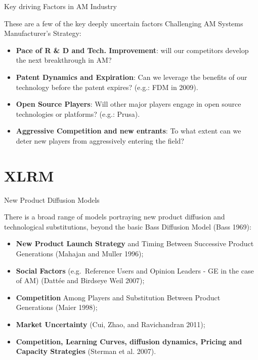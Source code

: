 \documentclass[12pt,ignorenonframetext,]{beamer}
\providecommand{\tightlist}{%
  \setlength{\itemsep}{0pt}\setlength{\parskip}{0pt}}
\begin{document}
\begin{frame}{Key driving Factors in AM Industry}
\protect\hypertarget{key-driving-factors-in-am-industry}{}

These are a few of the key deeply uncertain factors Challenging AM
Systems Manufacturer's Strategy:

\begin{itemize}
\item
  \textbf{Pace of R \& D and Tech. Improvement}: will our competitors
  develop the next breakthrough in AM?
\item
  \textbf{Patent Dynamics and Expiration}: Can we leverage the benefits
  of our technology before the patent expires? (e.g.: FDM in 2009).
\item
  \textbf{Open Source Players}: Will other major players engage in open
  source technologies or platforms? (e.g.: Prusa).
\item
  \textbf{Aggressive Competition and new entrants}: To what extent can
  we deter new players from aggressively entering the field?
\end{itemize}

\end{frame}

\hypertarget{xlrm}{%
\section{XLRM}\label{xlrm}}

\begin{frame}{New Product Diffusion Models}
\protect\hypertarget{new-product-diffusion-models}{}

There is a broad range of models portraying new product diffusion and
technological substitutions, beyond the basic Bass Diffusion Model (Bass
1969):

\begin{itemize}
\tightlist
\item
  \textbf{New Product Launch Strategy} and Timing Between Successive
  Product Generations (Mahajan and Muller 1996);
\item
  \textbf{Social Factors} (e.g.~Reference Users and Opinion Leaders - GE
  in the case of AM) (Dattée and Birdseye Weil 2007);
\item
  \textbf{Competition} Among Players and Substitution Between Product
  Generations (Maier 1998);
\item
  \textbf{Market Uncertainty} (Cui, Zhao, and Ravichandran 2011);
\item
  \textbf{Competition, Learning Curves, diffusion dynamics, Pricing and
  Capacity Strategies} (Sterman et al. 2007).
\end{itemize}

\end{frame}
\end{document}

